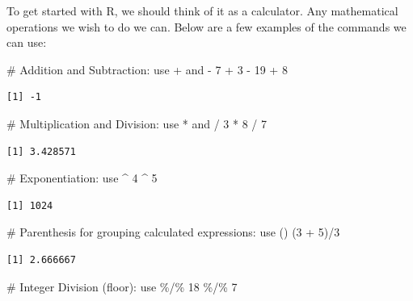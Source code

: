 \documentclass[
  letterpaper,
  DIV=11,
  numbers=noendperiod]{scrreprt}
\newenvironment{Shaded}{\begin{snugshade}}{\end{snugshade}}
\newcommand{\CommentTok}[1]{\textcolor[rgb]{0.37,0.37,0.37}{#1}}
\newcommand{\DecValTok}[1]{\textcolor[rgb]{0.68,0.00,0.00}{#1}}
\newcommand{\NormalTok}[1]{\textcolor[rgb]{0.00,0.23,0.31}{#1}}
\newcommand{\SpecialCharTok}[1]{\textcolor[rgb]{0.37,0.37,0.37}{#1}}
\begin{document}
To get started with R, we should think of it as a calculator. Any
mathematical operations we wish to do we can. Below are a few examples
of the commands we can use:

\begin{Shaded}
\begin{Highlighting}[]
\CommentTok{\# Addition and Subtraction: use + and {-}}
\DecValTok{7} \SpecialCharTok{+} \DecValTok{3} \SpecialCharTok{{-}} \DecValTok{19} \SpecialCharTok{+} \DecValTok{8}
\end{Highlighting}
\end{Shaded}

\begin{verbatim}
[1] -1
\end{verbatim}

\begin{Shaded}
\begin{Highlighting}[]
\CommentTok{\# Multiplication and Division: use * and /}
\DecValTok{3} \SpecialCharTok{*} \DecValTok{8} \SpecialCharTok{/} \DecValTok{7}
\end{Highlighting}
\end{Shaded}

\begin{verbatim}
[1] 3.428571
\end{verbatim}

\begin{Shaded}
\begin{Highlighting}[]
\CommentTok{\# Exponentiation: use \^{}}
\DecValTok{4} \SpecialCharTok{\^{}} \DecValTok{5}
\end{Highlighting}
\end{Shaded}

\begin{verbatim}
[1] 1024
\end{verbatim}

\begin{Shaded}
\begin{Highlighting}[]
\CommentTok{\# Parenthesis for grouping calculated expressions: use ()}
\NormalTok{(}\DecValTok{3} \SpecialCharTok{+} \DecValTok{5}\NormalTok{)}\SpecialCharTok{/}\DecValTok{3}
\end{Highlighting}
\end{Shaded}

\begin{verbatim}
[1] 2.666667
\end{verbatim}

\begin{Shaded}
\begin{Highlighting}[]
\CommentTok{\# Integer Division (floor): use \%/\%}
\DecValTok{18} \SpecialCharTok{\%/\%} \DecValTok{7}
\end{Highlighting}
\end{Shaded}
\end{document}

